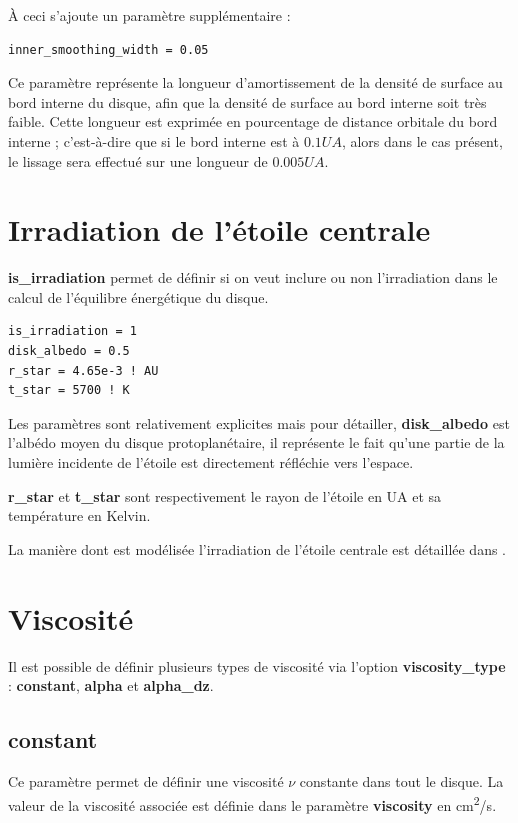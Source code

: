 \bigskip

À ceci s'ajoute un paramètre supplémentaire : 
\begin{verbatim}
inner_smoothing_width = 0.05
\end{verbatim}

Ce paramètre représente la longueur d'amortissement de la densité de surface au bord interne du disque, afin que la densité de surface au bord interne soit très faible. Cette longueur est exprimée en pourcentage de distance orbitale du bord interne ; c'est-à-dire que si le bord interne est à $0.1\unit{UA}$, alors dans le cas présent, le lissage sera effectué sur une longueur de $0.005\unit{UA}$.

\section{Irradiation de l'étoile centrale}
\textbf{is\_irradiation} permet de définir si on veut inclure ou non l'irradiation dans le calcul de l'équilibre énergétique du disque. 

\begin{verbatim}
is_irradiation = 1
disk_albedo = 0.5
r_star = 4.65e-3 ! AU
t_star = 5700 ! K
\end{verbatim}

Les paramètres sont relativement explicites mais pour détailler, \textbf{disk\_albedo} est l'albédo moyen du disque protoplanétaire, il représente le fait qu'une partie de la lumière incidente de l'étoile est directement réfléchie vers l'espace.

\textbf{r\_star} et \textbf{t\_star} sont respectivement le rayon de l'étoile en \unit{UA} et sa température en Kelvin.

La manière dont est modélisée l'irradiation de l'étoile centrale est détaillée dans .

\section{Viscosité}
Il est possible de définir plusieurs types de viscosité via l'option \textbf{viscosity\_type} : \textbf{constant}, \textbf{alpha} et \textbf{alpha\_dz}.

\subsection{constant}
Ce paramètre permet de définir une viscosité $\nu$ constante dans tout le disque. La valeur de la viscosité associée est définie dans le paramètre \textbf{viscosity} en \unit{cm^2/s}.

